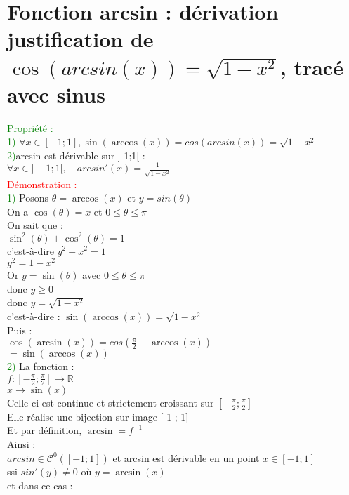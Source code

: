 \documentclass{article}
\begin{document}
	\section{Fonction arcsin : dérivation justification de $\cos(arcsin(x))= \sqrt{1-x^2}$, tracé avec sinus}
	\textcolor{green}{Propriété :} \\
	\textcolor{green}{1)} $ \forall x \in [-1;1],\sin(\arccos(x))=cos(arcsin(x))=\sqrt{1-x^2}$ \\ 
	\textcolor{green}{2)}arcsin est dérivable sur  ]-1;1[ : \\
	$\forall x \in ]-1;1[,\quad arcsin'(x)=\frac{1}{\sqrt{1-x^2}}$ \\
	\textcolor{red}{Démonstration :} \\ 
	\textcolor{green}{1)} Posons $\theta = \arccos(x)$ et $y=sin(\theta)$ \\
	On a $\cos(\theta)=x$ et $0 \leq \theta \leq \pi$ \\
	On sait que : \\
	$\sin^2(\theta) + \cos^2(\theta)=1$ \\
	c'est-à-dire $y^2 + x^2= 1$ \\
	\indent $y^2=1-x^2$ \\
	Or $y= \sin(\theta)$ avec $0 \leq \theta \leq \pi$ \\
	donc $y \geq 0$ \\
	donc $y= \sqrt{1-x^2}$ \\
	c'est-à-dire : $\sin(\arccos(x))= \sqrt{1-x^2}$ \\
	Puis : \\
	$\cos(\arcsin(x))=cos(\frac{\pi}{2}-\arccos(x))$ \\
	\indent $=\sin(\arccos(x))$ \\
	\textcolor{green}{2)} La fonction : \\
	 $f : [-\frac{\pi}{2}; \frac{\pi}{2}] \rightarrow \mathbb{R}$ \\
\indent $ x \rightarrow \sin(x) $ \\
Celle-ci est continue et strictement croissant sur $[- \frac{\pi}{2};\frac{\pi}{2}]$ \\
Elle réalise une bijection sur image [-1 ; 1] \\
Et par définition, $\arcsin=f^{-1}$ \\
Ainsi : \\
$arcsin \in \mathcal{C}^0([-1;1])$ et arcsin est dérivable en un point $x \in [-1 ; 1]$ \\
ssi $sin'(y) \neq 0$ où $y=\arcsin(x)$ \\
et dans ce cas : \\
\end{document}
